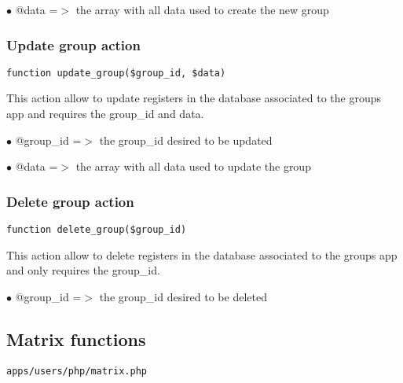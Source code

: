 \documentclass[a4paper]{article}
\begin{document}
\begin{compactitem}
\item[\color{myblue}$\bullet$] @data =$>$ the array with all data used to create the new group
\end{compactitem}

\hypertarget{toc166}{}
\subsubsection{Update group action}

\begin{lstlisting}
function update_group($group_id, $data)
\end{lstlisting}

This action allow to update registers in the database associated to
the groups app and requires the group\_id and data.

\begin{compactitem}
\item[\color{myblue}$\bullet$] @group\_id =$>$ the group\_id desired to be updated
\item[\color{myblue}$\bullet$] @data     =$>$ the array with all data used to update the group
\end{compactitem}

\hypertarget{toc167}{}
\subsubsection{Delete group action}

\begin{lstlisting}
function delete_group($group_id)
\end{lstlisting}

This action allow to delete registers in the database associated to
the groups app and only requires the group\_id.

\begin{compactitem}
\item[\color{myblue}$\bullet$] @group\_id =$>$ the group\_id desired to be deleted
\end{compactitem}

\hypertarget{toc168}{}
\subsection{Matrix functions}

\begin{lstlisting}
apps/users/php/matrix.php
\end{lstlisting}
\end{document}
